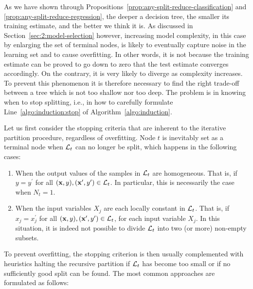 As we have shown through Propositions~\ref{prop:any-split-reduce-classification}
and \ref{prop:any-split-reduce-regression}, the deeper a
decision tree, the smaller its training estimate, and the better we think it
is. As discussed in Section~\ref{sec:2:model-selection} however, increasing
model complexity, in this case by enlarging  the set of terminal
nodes, is likely to eventually capture noise in the learning set and to cause
overfitting. In other words, it is not because the training estimate can be
proved to go down to zero that the test estimate converges accordingly. On the
contrary, it is very likely to diverge as complexity increases. To prevent this
phenomenon it is therefore necessary to find the right trade-off between a tree
which is not too shallow nor too deep. The problem is in knowing when to stop
splitting, i.e., in how to carefully formulate Line~\ref{algo:induction:stop} of
Algorithm~\ref{algo:induction}.

Let us first consider the stopping criteria that are inherent to the iterative
partition procedure, regardless of overfitting. Node $t$ is inevitably
set as a terminal node when ${\cal L}_t$ can no longer be split, which happens in the
following cases:

\begin{enumerate}

\item When the output values of the samples in ${\cal L}_t$ are homogeneous.
That is, if $y = y^\prime$ for all $(\mathbf{x}, y),
(\mathbf{x}^\prime, y^\prime) \in {\cal L}_t$. In particular, this is
necessarily the case when $N_t = 1$.

\item When the input variables $X_j$ are each locally constant in ${\cal L}_t$.
That is, if $x_j = x^\prime_j$ for all $(\mathbf{x}, y),
(\mathbf{x}^\prime, y^\prime) \in {\cal L}_t$, for each input variable
$X_j$. In this situation, it is indeed not possible
to divide ${\cal L}_t$ into two (or more) non-empty subsets.

\end{enumerate}

To prevent overfitting, the stopping criterion is then usually complemented
with heuristics halting the recursive partition if ${\cal L}_t$ has become too
small or if no sufficiently good split can be found. The most common approaches
are formulated as follows:

